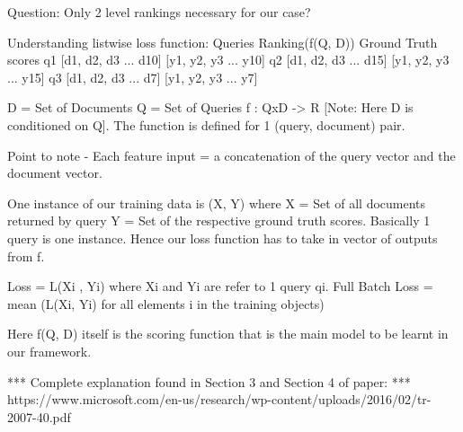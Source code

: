 \documentclass[12pt, twoside, ngerman]{report}
\begin{document}
    Question: Only 2 level rankings necessary for our case?

Understanding listwise loss function:
    Queries       Ranking(f(Q, D))      Ground Truth scores
    q1        [d1, d2, d3 ... d10]      [y1, y2, y3 ... y10]
    q2        [d1, d2, d3 ... d15]      [y1, y2, y3 ... y15]
    q3        [d1, d2, d3 ... d7]       [y1, y2, y3 ... y7]

    D = {Set of Documents}
    Q = {Set of Queries}
    f : QxD -> R [Note: Here D is conditioned on Q]. The function is defined for 1 (query, document) pair.

    Point to note - Each feature input = a concatenation of the query vector and the document vector.

    One instance of our training data is (X, Y) where X = {Set of all documents returned by query} Y = {Set of the respective ground
    truth scores}. Basically 1 query is one instance. Hence our loss function has to take in vector of outputs from f.

    Loss = L(Xi , Yi) where Xi and Yi are refer to 1 query qi.
    Full Batch Loss = mean (L(Xi, Yi) for all elements i in the training objects)

    Here f(Q, D) itself is the scoring function that is the main model to be learnt in our framework.

    *** Complete explanation found in Section 3 and Section 4 of paper:
        *** https://www.microsoft.com/en-us/research/wp-content/uploads/2016/02/tr-2007-40.pdf
\end{document}
